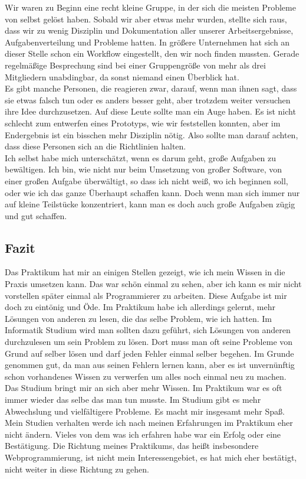 Wir waren zu Beginn eine recht kleine Gruppe, in der sich die meisten Probleme von selbst gelöst haben. Sobald wir aber etwas mehr wurden, stellte sich raus, dass wir zu wenig Disziplin und Dokumentation aller unserer Arbeitsergebnisse, Aufgabenverteilung und Probleme hatten. In größere Unternehmen hat sich an dieser Stelle schon ein Workflow eingestellt, den wir noch finden mussten. Gerade regelmäßige Besprechung sind bei einer Gruppengröße von mehr als drei Mitgliedern unabdingbar, da sonst niemand einen Überblick hat.\\

Es gibt manche Personen, die reagieren zwar, darauf, wenn man ihnen sagt, dass sie etwas falsch tun oder es anders besser geht, aber trotzdem weiter versuchen ihre Idee durchzusetzen. Auf diese Leute sollte man ein Auge haben. Es ist nicht schlecht zum entwerfen eines Prototyps, wie wir feststellen konnten, aber im Endergebnis ist ein bisschen mehr Disziplin nötig. Also sollte man darauf achten, dass diese Personen sich an die Richtlinien halten.\\

Ich selbst habe mich unterschätzt, wenn es darum geht, große Aufgaben zu bewältigen. Ich bin, wie nicht nur beim Umsetzung von großer Software, von einer großen Aufgabe überwältigt, so dass ich nicht weiß, wo ich beginnen soll, oder wie ich das ganze Überhaupt schaffen kann. Doch wenn man sich immer nur auf kleine Teilstücke konzentriert, kann man es doch auch große Aufgaben zügig und gut schaffen.

\subsection{Fazit}

Das Praktikum hat mir an einigen Stellen gezeigt, wie ich mein Wissen in die Praxis umsetzen kann. Das war schön einmal zu sehen, aber ich kann es mir nicht vorstellen später einmal als Programmierer zu arbeiten. Diese Aufgabe ist mir doch zu eintönig und Öde. Im Praktikum habe ich allerdings gelernt, mehr Lösungen von anderen zu lesen, die das selbe Problem, wie ich hatten. Im Informatik Studium wird man sollten dazu geführt, sich Lösungen von anderen durchzulesen um sein Problem zu lösen. Dort muss man oft seine Probleme von Grund auf selber lösen und darf jeden Fehler einmal selber begehen. Im Grunde genommen gut, da man aus seinen Fehlern lernen kann, aber es ist unvernünftig schon vorhandenes Wissen zu verwerfen um alles noch einmal neu zu machen.\\
Das Studium bringt mir an sich aber mehr Wissen. Im Praktikum war es oft immer wieder das selbe das man tun musste. Im Studium gibt es mehr Abwechslung und vielfältigere Probleme. Es macht mir insgesamt mehr Spaß.\\
Mein Studien verhalten werde ich nach meinen Erfahrungen im Praktikum eher nicht ändern. Vieles von dem was ich erfahren habe war ein Erfolg oder eine Bestätigung. Die Richtung meines Praktikums, das heißt insbesondere Webprogrammierung, ist nicht mein Interessengebiet, es hat mich eher bestätigt, nicht weiter in diese Richtung zu gehen.\\

